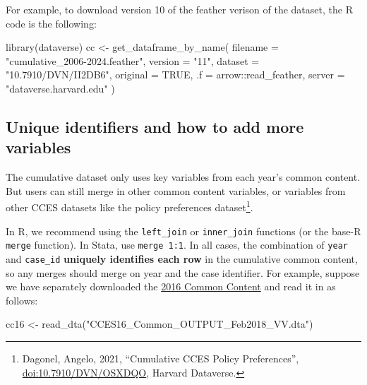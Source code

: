 \documentclass[10pt,article,oneside]{memoir}
\newenvironment{Shaded}{\begin{snugshade}}{\end{snugshade}}
\newcommand{\AttributeTok}[1]{\textcolor[rgb]{0.40,0.45,0.13}{#1}}
\newcommand{\ConstantTok}[1]{\textcolor[rgb]{0.56,0.35,0.01}{#1}}
\newcommand{\FunctionTok}[1]{\textcolor[rgb]{0.28,0.35,0.67}{#1}}
\newcommand{\NormalTok}[1]{\textcolor[rgb]{0.00,0.23,0.31}{#1}}
\newcommand{\OtherTok}[1]{\textcolor[rgb]{0.00,0.23,0.31}{#1}}
\newcommand{\SpecialCharTok}[1]{\textcolor[rgb]{0.37,0.37,0.37}{#1}}
\newcommand{\StringTok}[1]{\textcolor[rgb]{0.13,0.47,0.30}{#1}}
\begin{document}
For example, to download version 10 of the feather verison of the
dataset, the R code is the following:

\begin{Shaded}
\begin{Highlighting}[]
\FunctionTok{library}\NormalTok{(dataverse)}
\NormalTok{cc }\OtherTok{\textless{}{-}} \FunctionTok{get\_dataframe\_by\_name}\NormalTok{(}
  \AttributeTok{filename =} \StringTok{"cumulative\_2006{-}2024.feather"}\NormalTok{,}
  \AttributeTok{version =} \StringTok{"11"}\NormalTok{,}
  \AttributeTok{dataset =} \StringTok{"10.7910/DVN/II2DB6"}\NormalTok{,}
  \AttributeTok{original =} \ConstantTok{TRUE}\NormalTok{,}
  \AttributeTok{.f =}\NormalTok{ arrow}\SpecialCharTok{::}\NormalTok{read\_feather,}
  \AttributeTok{server =} \StringTok{"dataverse.harvard.edu"}
\NormalTok{)}
\end{Highlighting}
\end{Shaded}

\subsection{Unique identifiers and how to add more
variables}\label{unique-identifiers-and-how-to-add-more-variables}

The cumulative dataset only uses key variables from each year's common
content. But users can still merge in other common content variables, or
variables from other CCES datasets like the policy preferences
dataset\footnote{Dagonel, Angelo, 2021, ``Cumulative CCES Policy Preferences'', \href{https://dataverse.harvard.edu/dataset.xhtml?persistentId=doi:10.7910/DVN/OSXDQO}{\url{doi:10.7910/DVN/OSXDQO}}, Harvard Dataverse.}.

In R, we recommend using the \texttt{left\_join} or \texttt{inner\_join}
functions (or the base-R \texttt{merge} function). In Stata, use
\texttt{merge\ 1:1}. In all cases, the combination of \texttt{year} and
\texttt{case\_id} \textbf{uniquely identifies each row} in the
cumulative common content, so any merges should merge on year and the
case identifier. For example, suppose we have separately downloaded the
\href{https://doi.org/10.7910/DVN/GDF6Z0/JPMOZZ}{2016 Common Content}
and read it in as follows:

\begin{Shaded}
\begin{Highlighting}[]
\NormalTok{cc16 }\OtherTok{\textless{}{-}} \FunctionTok{read\_dta}\NormalTok{(}\StringTok{"CCES16\_Common\_OUTPUT\_Feb2018\_VV.dta"}\NormalTok{)}
\end{Highlighting}
\end{Shaded}
\end{document}
